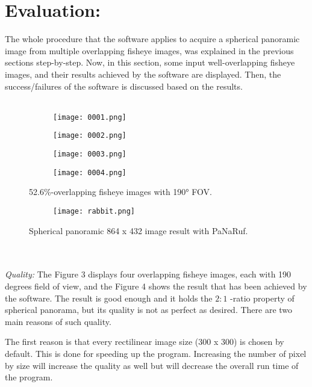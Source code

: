 \documentclass{article}
\begin{document}
\section*{Evaluation:}
The whole procedure that the software applies to acquire a spherical panoramic image from multiple overlapping fisheye images, was explained in the previous sections step-by-step. Now, in this section, 
some input well-overlapping fisheye images, and their results achieved by the software are displayed. Then, the success/failures of the software is discussed based on the results.\\~\\
\begin{figure}[h!]
  \centering
  \begin{subfigure}[b]{0.2\linewidth}
    \texttt{[image: 0001.png]}
  \end{subfigure}
  \begin{subfigure}[b]{0.2\linewidth}
    \texttt{[image: 0002.png]}
  \end{subfigure}
  \begin{subfigure}[b]{0.2\linewidth}
    \texttt{[image: 0003.png]}
  \end{subfigure}
  \begin{subfigure}[b]{0.2\linewidth}
    \texttt{[image: 0004.png]}
  \end{subfigure}
    \caption{52.6\%-overlapping fisheye images with \ang{190} FOV.}
  \begin{subfigure}[b]{1.0\linewidth}
    \texttt{[image: rabbit.png]}
  \end{subfigure}
  \caption{Spherical panoramic 864 x 432 image result with PaNaRuf.}
\end{figure}
\ \\~\\
\textit{Quality:}
The Figure 3 displays four overlapping fisheye images, each with 190 degrees field of view, and the Figure 4 shows the result that has been achieved by the software. The result is good enough and it holds the $2 : 1$ -ratio property of spherical panorama, but its quality is not as perfect as desired. There are two main reasons of such quality.

The first reason is that every rectilinear image size (300 x 300) is chosen by default. This is done for speeding up the program. Increasing the number of pixel by size will increase the quality as well but will decrease the overall run time of the program.
\end{document}
